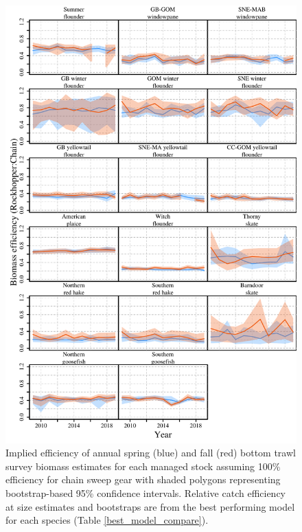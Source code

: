 \documentclass[
  12pt,
]{article}
\begin{document}
\begin{figure}
\caption{Implied efficiency of annual spring (blue) and fall (red) bottom trawl survey biomass estimates for each managed stock assuming 100\% efficiency for chain sweep gear with shaded polygons representing bootstrap-based 95\% confidence intervals. Relative catch efficiency at size estimates and bootstraps are from the best performing model for each species (Table \ref{best_model_compare}).}\label{stock_biomass_efficiency_plot}
\begin{center}
\includegraphics[height = 0.8\textheight]{stock_biomass_efficiency_plot.pdf}
\end{center}
\end{figure}

\clearpage
\end{document}
